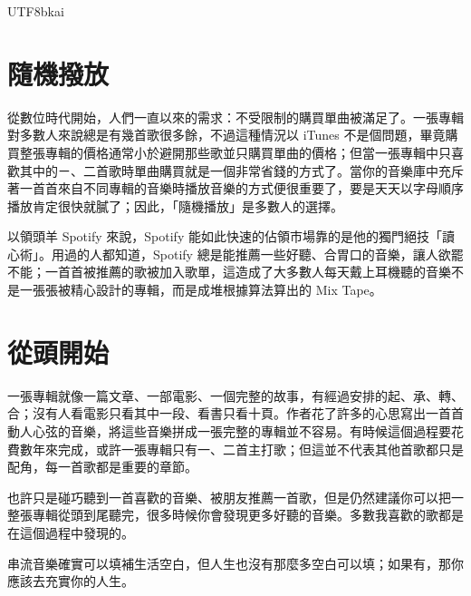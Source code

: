 \documentclass[a4paper, 12pt, oneside]{article}
\begin{document}
\begin{CJK}{UTF8}{bkai}
\section*{隨機撥放}
從數位時代開始，人們一直以來的需求：不受限制的購買單曲被滿足了。一張專輯對多數人來說總是有幾首歌很多餘，不過這種情況以 iTunes 不是個問題，畢竟購買整張專輯的價格通常小於避開那些歌並只購買單曲的價格；但當一張專輯中只喜歡其中的ㄧ、二首歌時單曲購買就是一個非常省錢的方式了。當你的音樂庫中充斥著一首首來自不同專輯的音樂時播放音樂的方式便很重要了，要是天天以字母順序播放肯定很快就膩了；因此，「隨機播放」是多數人的選擇。

以領頭羊 Spotify 來說，Spotify 能如此快速的佔領市場靠的是他的獨門絕技「讀心術」。用過的人都知道，Spotify 總是能推薦一些好聽、合胃口的音樂，讓人欲罷不能；一首首被推薦的歌被加入歌單，這造成了大多數人每天戴上耳機聽的音樂不是一張張被精心設計的專輯，而是成堆根據算法算出的 Mix Tape。

\section*{從頭開始}
一張專輯就像一篇文章、一部電影、一個完整的故事，有經過安排的起、承、轉、合；沒有人看電影只看其中一段、看書只看十頁。作者花了許多的心思寫出一首首動人心弦的音樂，將這些音樂拼成一張完整的專輯並不容易。有時候這個過程要花費數年來完成，或許一張專輯只有一、二首主打歌；但這並不代表其他首歌都只是配角，每一首歌都是重要的章節。

也許只是碰巧聽到一首喜歡的音樂、被朋友推薦一首歌，但是仍然建議你可以把一整張專輯從頭到尾聽完，很多時候你會發現更多好聽的音樂。多數我喜歡的歌都是在這個過程中發現的。
\begin{fancyquotes}
	串流音樂確實可以填補生活空白，但人生也沒有那麼多空白可以填；如果有，那你應該去充實你的人生。
\end{fancyquotes}
\end{CJK}
\end{document}
